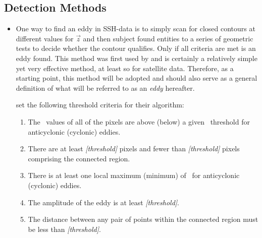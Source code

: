 \subsection{Detection Methods} \label{subsec:detectmethods}
\begin{itemize}

	\item
	One way to find an eddy in SSH-data is to simply scan for closed contours at different values for $\vec{z}$ and then subject found entities to a series of geometric tests to decide whether the contour qualifies. Only if all criteria are met is an eddy found. This method was first used by \citet{Chelton2011} and is certainly a relatively simple yet very effective method, at least so for satellite data. Therefore, as a starting point, this method will be adopted and should also serve as a general definition of what will be referred to as an \textit{eddy} hereafter.
	
 set the following threshold criteria for their algorithm:
	\begin{enumerate}
		\item
		The \SSH~values of all of the pixels are above (below) a given \SSH~threshold for anticyclonic (cyclonic) eddies.
		\item
		There are at least \textit{[threshold]} pixels and fewer than \textit{[threshold]} pixels comprising the connected region.
		\item
		There is at least one local maximum (minimum) of \SSH~for anticyclonic (cyclonic) eddies.
		\item
		The amplitude of the eddy is at least \textit{[threshold]}.
		\item
		The distance between any pair of points within the connected region must be less than \textit{[threshold]}.
	\end{enumerate}


\end{itemize}
